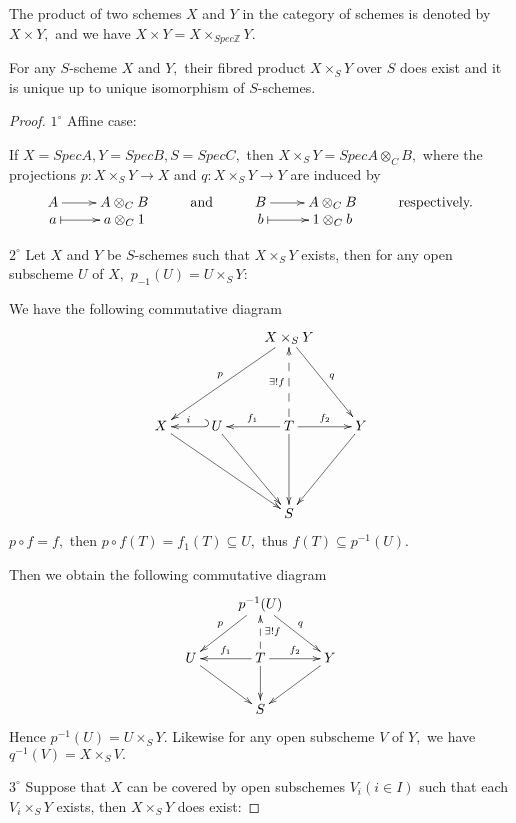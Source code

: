 \begin{remark}
The product of two schemes $X$ and $Y$ in the category of schemes is
denoted by $X \times Y,$ and we have $X \times Y=X
\times_{Spec\mathbb{Z}} Y.$
\end{remark}
\begin{prop}
For any $S$-scheme $X$ and $Y,$ their fibred product $X \times_S Y$
over $S$ does exist and it is unique up to unique isomorphism of
$S$-schemes.
\end{prop}
\begin{proof}
$\mathit{1^{\circ}}$ Affine case:

If $X=SpecA, Y=SpecB, S=SpecC,$ then $X \times_S Y=SpecA\otimes_C
B,$ where the projections $p: X \times_S Y \rightarrow X$ and $q:X
\times_S Y\rightarrow Y$ are induced by
\[ \xymatrix@R=-0.25em{
   A \ar[r]  & {A \otimes_C B} & \text{and} & B \ar[r]  & {A \otimes_C B} &
   \text{respectively.}\\
   a \ar@{|->}[r] & {a \otimes_C 1} &     & b \ar@{|->}[r] & {1 \otimes_C
   b} }  \]

$\mathit{2^{\circ}}$ Let $X$ and $Y$ be $S$-schemes such that $X
\times_S Y$ exists, then for any open subscheme $U$ of $X,$
$p_{-1}(U)=U \times_S Y$:

We have the following commutative diagram
\[ \xymatrix@R=5em{
   &  & {X \times_S Y} \ar"2,1"_{p} \ar"2,4"^{q}          \\
   X \ar"3,3" & \,U \ar@{_{(}->}[l]_{i} \ar"3,3"
   & T \ar[l]_{f_1} \ar[r]^{f_2} \ar@{-->}[u]^{\exists !f} \ar[d]
   & Y \ar"3,3"                                               \\
   & & S    }   \]
$p\circ f=f,$ then $p\circ f(T)=f_1(T)\subseteq U,$ thus
$f(T)\subseteq p^{-1}(U).$

Then we obtain the following commutative diagram
\[ \xymatrix{
   & {p^{-1}(U)} \ar"2,1"_{p} \ar"2,3"^{q}           \\
   U \ar"3,2" & T \ar@{-->}[u]_{\exists !f} \ar[l]_{f_1}
   \ar[r]^{f_2} \ar[d] & Y  \ar"3,2"                 \\
   & S  }     \]
Hence $p^{-1}(U)=U \times_S Y.$ Likewise for any open subscheme $V$
of $Y,$ we have $q^{-1}(V)=X \times_S V.$

$\mathit{3^{\circ}}$ Suppose that $X$ can be covered by open
subschemes $V_{i}(i\in I)$ such that each $V_{i} \times_S Y$ exists,
then $X \times_S Y$ does exist:


\end{proof}
